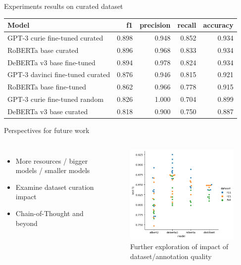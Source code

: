 \documentclass[aspectratio=149]{beamer}
\begin{document}
\begin{frame}{Experiments results on curated dataset}
\fontsize{9pt}{10pt}\selectfont
\begin{table}[!htb]
    \centering
    \label{tab:results}
\begin{tabular}{lrrrr}
\toprule
                        Model &    f1 &  precision &  recall &  accuracy \\
\midrule
  GPT-3 curie fine-tuned curated & 0.898 &      0.948 &   0.852 &     0.934 \\
            RoBERTa base curated & 0.896 &      0.968 &   0.833 &     0.934 \\
      DeBERTa v3 base fine-tuned & 0.894 &      0.978 &   0.824 &     0.934 \\
GPT-3 davinci fine-tuned curated & 0.876 &      0.946 &   0.815 &     0.921 \\
         RoBERTa base fine-tuned & 0.862 &      0.966 &   0.778 &     0.915 \\
   GPT-3 curie fine-tuned random & 0.826 &      1.000 &   0.704 &     0.899 \\
         DeBERTa v3 base curated & 0.818 &      0.900 &   0.750 &     0.887 \\
\bottomrule
\end{tabular}
\end{table}

\end{frame}

\begin{frame}{Perspectives for future work}
			\begin{columns}
			\begin{itemize}
  \item More resources / bigger models / smaller models
  \item Examine dataset curation impact
  \item Chain-of-Thought and beyond
\end{itemize}
			\begin{figure}[h]
    \centering
    \includegraphics[width=6cm]{./f1}
\caption{Further exploration of impact of dataset/annotation quality }
\end{figure}
			\end{columns}


\end{frame}
\end{document}
